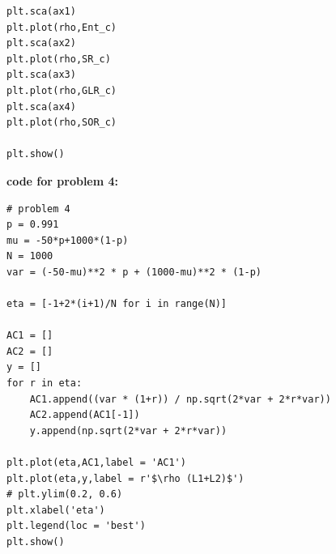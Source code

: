 \documentclass[letterpaper,11pt]{article}
\begin{document}
\begin{spacing}{1.2}
\begin{lstlisting}[title=code for problem 1, frame=shadowbox]
plt.sca(ax1)
plt.plot(rho,Ent_c)
plt.sca(ax2)
plt.plot(rho,SR_c)
plt.sca(ax3)
plt.plot(rho,GLR_c)
plt.sca(ax4)
plt.plot(rho,SOR_c)

plt.show()
\end{lstlisting}

\textbf{code for problem 4:}
\begin{lstlisting}[title=code for problem 4, frame=shadowbox]
# problem 4
p = 0.991
mu = -50*p+1000*(1-p)
N = 1000
var = (-50-mu)**2 * p + (1000-mu)**2 * (1-p)

eta = [-1+2*(i+1)/N for i in range(N)]

AC1 = []
AC2 = []
y = []
for r in eta:
    AC1.append((var * (1+r)) / np.sqrt(2*var + 2*r*var))
    AC2.append(AC1[-1])
    y.append(np.sqrt(2*var + 2*r*var))

plt.plot(eta,AC1,label = 'AC1')
plt.plot(eta,y,label = r'$\rho (L1+L2)$')
# plt.ylim(0.2, 0.6)
plt.xlabel('eta')
plt.legend(loc = 'best')
plt.show()
\end{lstlisting}

\end{spacing}
\end{document}
